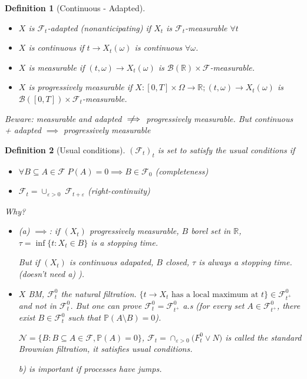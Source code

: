 \documentclass{article}
\newtheorem{definition}{Definition}
\newcommand{\notimplies}{
  \mathrel{{\ooalign{\hidewidth$\not\phantom{=}$\hidewidth\cr$\implies$}}}}
\begin{document}
\begin{definition}[Continuous - Adapted]
  \begin{itemize}
  \item $X$ is $\mathcal F_t$-adapted (nonanticipating) if $X_t$ is $\mathcal F_t$-measurable $\forall t$
  \item $X$ is continuous if $t \rightarrow X_t(\omega)$ is continuous $\forall \omega$.
  \item $X$ is measurable if $(t, \omega) \rightarrow X_t(\omega)$ is $\mathcal B(\mathbb R) \times \mathcal F$-measurable.
  \item $X$ is progressively measurable if $X: [0, T] \times \Omega \rightarrow \mathbb R; (t, \omega) \rightarrow X_t(\omega)$ is $\mathcal B([0, T]) \times \mathcal F_t$-measurable.
  \end{itemize}
  Beware: measurable and adapted $\notimplies$ progressively measurable.
  But continuous + adapted $\implies$ progressively measurable
\end{definition}
\begin{definition}[Usual conditions]
  $(\mathcal F_t)_t$ is set to satisfy the \emph{usual conditions} if
  \begin{itemize}
  \item[a)] $\forall B \subseteq A \in \mathcal F \;   P(A) = 0 \implies B \in \mathcal F_0$ (completeness)
  \item[b)] $\mathcal F_t = \cup_{\varepsilon > 0} \; \mathcal F_{t+\varepsilon}$ (right-continuity)
  \end{itemize}
  Why?
  \begin{itemize}
  \item (a) $\implies$: if $(X_t)$ progressively measurable, $B$ borel set in $\mathbb R$, $\tau = \inf \{ t: X_t \in B \}$ is a stopping time.
    
    But if $(X_t)$ is continuous adapated, $B$ closed, $\tau$ is always a stopping time. (doesn't need a) ).
  \item $X$ BM, $\mathcal F_t^0$ the natural filtration. $\{ t \rightarrow X_t \text{ has a local maximum at } t \} \in \mathcal F_{t^+}^0$ and not in $\mathcal F_t^0$. But one can prove $\mathcal F_t^0 = \mathcal F_{t^+}^0$ a.s (for every set  $A \in \mathcal F_{t^+}^0$, there exist $B \in \mathcal F_{t}^0$ such that $\mathbb P(A \setminus B) = 0$).
  
  $\mathcal N = \{ B: B \subseteq A \in \mathcal F, \mathbb P(A) = 0 \}$, $\mathcal F_t = \cap_{\varepsilon > 0} \mathcal (F^0_t \vee N)$ is called the standard Brownian filtration, it satisfies usual conditions.
  
    b) is important if processes have jumps.
  \end{itemize}
\end{definition}
\end{document}
